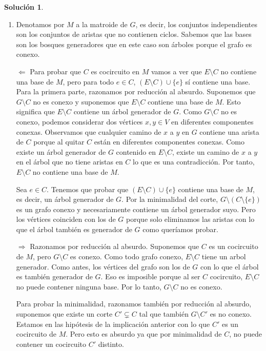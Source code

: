 \documentclass[10pt]{article}
\theoremstyle{definition}
\newtheorem*{sol}{Solución}
\begin{document}
\begin{sol}
\begin{enumerate}
\item Denotamos por $M$ a la matroide de $G$, es decir, los conjuntos independientes son los conjuntos de aristas que no contienen ciclos. Sabemos que las bases son los bosques generadores que en este caso son árboles porque el grafo es conexo.

$\Longleftarrow$ Para probar que $C$ es cocircuito en $M$ vamos a ver que $E\setminus C$ no contiene una base de $M$, pero para todo $e\in C$, $(E\setminus C)\cup\{e\}$ sí contiene una base. Para la primera parte, razonamos por reducción al absurdo. Suponemos que $G\setminus C$ no es conexo y suponemos que $E\setminus C$ contiene una base de $M$. Esto significa que $E\setminus C$ contiene un árbol generador de $G$. Como $G\setminus C$ no es conexo, podemos considerar dos vértices $x,y\in V$ en diferentes componentes conexas. Observamos que cualquier camino de $x$ a $y$ en $G$ contiene una arista de $C$ porque al quitar $C$ están en diferentes componentes conexas. Como existe un árbol generador de $G$ contenido en $E\setminus C$, existe un camino de $x$ a $y$ en el árbol que no tiene aristas en $C$ lo que es una contradicción. Por tanto, $E\setminus C$ no contiene una base de $M$.

Sea $e\in C$. Tenemos que probar que $(E\setminus C)\cup \{e\}$ contiene una base de $M$, es decir, un árbol generador de $G$. Por la minimalidad del corte, $G\setminus (C\setminus \{e\})$ es un grafo conexo y necesariamente contiene un árbol generador suyo. Pero los vértices coinciden con los de $G$ porque solo eliminamos las aristas con lo que el árbol también es generador de $G$ como queríamos probar.


$\Longrightarrow$ Razonamos por reducción al absurdo. Suponemos que $C$ es un cocircuito de $M$, pero $G\setminus C$ es conexo. Como todo grafo conexo, $E\setminus C$ tiene un arbol generador. Como antes, los vértices del grafo son los de $G$ con lo que el árbol es también generador de $G$. Eso es imposible porque al ser $C$ cocircuito, $E\setminus C$ no puede contener ninguna base. Por lo tanto, $G\setminus C$ no es conexo.

Para probar la minimalidad, razonamos también por reducción al absurdo, suponemos que existe un corte $C'\subsetneq C$ tal que también $G\setminus C'$ es no conexo. Estamos en las hipótesis de la implicación anterior con lo que $C'$ es un cocircuito de $M$. Pero esto es absurdo ya que por minimalidad de $C$, no puede contener un cocircuito $C'$ distinto.

\end{enumerate}
\end{sol}
\end{document}
